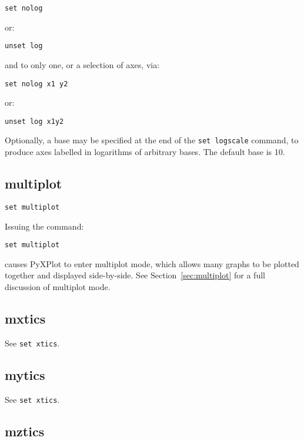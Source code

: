 \begin{verbatim}
set nolog
\end{verbatim}

\noindent or:

\begin{verbatim}
unset log
\end{verbatim}

\noindent and to only one, or a selection of axes, via:

\begin{verbatim}
set nolog x1 y2
\end{verbatim}

\noindent or:

\begin{verbatim}
unset log x1y2
\end{verbatim}

Optionally, a base may be specified at the end of the {\tt set logscale}
command, to produce axes labelled in logarithms of arbitrary bases.  The default
base is 10.


\subsection{multiplot}

\begin{verbatim}
set multiplot
\end{verbatim}

Issuing the command:

\begin{verbatim}
set multiplot
\end{verbatim}

\noindent causes PyXPlot to enter multiplot mode, which allows many graphs to
be plotted together and displayed side-by-side. See Section~\ref{sec:multiplot}
for a full discussion of multiplot mode.


\subsection{mxtics}

See {\tt set xtics}.


\subsection{mytics}

See {\tt set xtics}.


\subsection{mztics}

